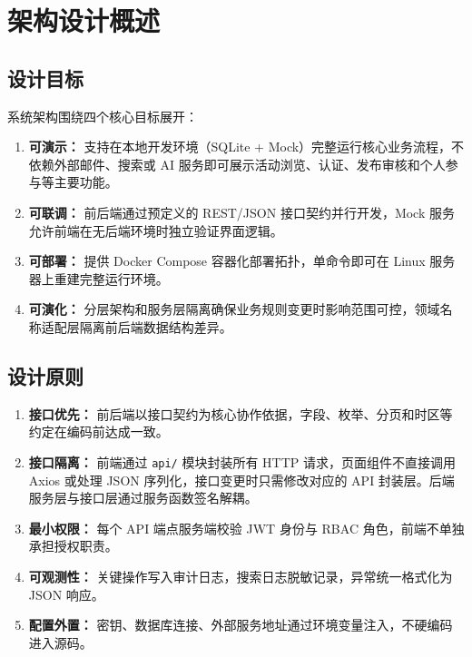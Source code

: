 \documentclass[12pt,a4paper]{ctexart}
\begin{document}
\tableofcontents\clearpage{}

\section{架构设计概述}
\subsection{设计目标}
系统架构围绕四个核心目标展开：
\begin{enumerate}
\item \textbf{可演示：} 支持在本地开发环境（SQLite + Mock）完整运行核心业务流程，不依赖外部邮件、搜索或 AI 服务即可展示活动浏览、认证、发布审核和个人参与等主要功能。
\item \textbf{可联调：} 前后端通过预定义的 REST/JSON 接口契约并行开发，Mock 服务允许前端在无后端环境时独立验证界面逻辑。
\item \textbf{可部署：} 提供 Docker Compose 容器化部署拓扑，单命令即可在 Linux 服务器上重建完整运行环境。
\item \textbf{可演化：} 分层架构和服务层隔离确保业务规则变更时影响范围可控，领域名称适配层隔离前后端数据结构差异。
\end{enumerate}

\subsection{设计原则}
\begin{enumerate}
\item \textbf{接口优先：} 前后端以接口契约为核心协作依据，字段、枚举、分页和时区等约定在编码前达成一致。
\item \textbf{接口隔离：} 前端通过 \texttt{api/} 模块封装所有 HTTP 请求，页面组件不直接调用 Axios 或处理 JSON 序列化，接口变更时只需修改对应的 API 封装层。后端服务层与接口层通过服务函数签名解耦。
\item \textbf{最小权限：} 每个 API 端点服务端校验 JWT 身份与 RBAC 角色，前端不单独承担授权职责。
\item \textbf{可观测性：} 关键操作写入审计日志，搜索日志脱敏记录，异常统一格式化为 JSON 响应。
\item \textbf{配置外置：} 密钥、数据库连接、外部服务地址通过环境变量注入，不硬编码进入源码。
\end{enumerate}
\end{document}
